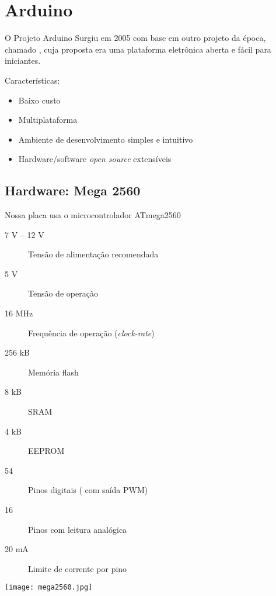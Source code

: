 \section{Arduino}


\begin{frame}{O Projeto Arduino}
  Surgiu em 2005 com base em outro projeto da época, chamado , cuja proposta era uma plataforma eletrônica aberta e fácil para iniciantes.

  \medskip
  Características:
  \begin{itemize}
    \item Baixo custo
    \item Multiplataforma
    \item Ambiente de desenvolvimento simples e intuitivo
    \item Hardware/software \textit{open source} extensíveis
  \end{itemize}
\end{frame}


\subsection{Hardware: Mega 2560}


\begin{frame}{\insertsubsection}
  Nossa placa usa o microcontrolador \textcolor{CustomTeal}{ATmega2560}
  \begin{description}
    \item[7 V -- 12 V] Tensão de alimentação recomendada
    \item[5 V] Tensão de operação
    \item[16 MHz] Frequência de operação (\textit{clock-rate})
    \item[256 kB] Memória flash
    \item[8 kB] SRAM
    \item[4 kB] EEPROM
    \item[54] Pinos digitais ( com saída PWM)
    \item[16] Pinos com leitura analógica
    \item[20 mA] Limite de corrente por pino
  \end{description}
\end{frame}


{ 
\begin{frame}{\insertsubsection}
  \texttt{[image: mega2560.jpg]}
\end{frame}
}


